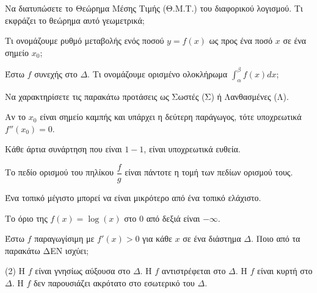 \documentclass[11pt,a4paper]{article}
\newcommand{\kerkissans}[1]{{\fontfamily{maksf}\selectfont \textbf{#1}}}
\renewcommand{\textdexiakeraia}{}
\newcommand\themanum{A}
\newcounter{thema}[section]
\renewcommand{\thethema}{\arabic{thema}}
\newcommand{\Thema}{\refstepcounter{thema}{\textbf{\textcolor{black}{\faPenSquare\ \  \large \kerkissans{\textbf{\thethemaο\hspace{2mm}Διαγώνισμα - Θέμα \themanum}}}}}\hspace{0mm}}{}
\newenvironment{thema}[1]
{\begin{tcolorbox}[title=\Thema\kerkissans{\textbf{\large{  #1}}},breakable,
enhanced standard,titlerule=0pt,toprule=0pt, rightrule=0pt, bottomrule=0pt,
colback=white,left=0mm,top=1mm,bottom=0mm,
boxrule=0pt,
colframe=white,leftrule=0mm,sharp corners,coltitle=black]
\renewcommand{\themanum}{#1}}
{\end{tcolorbox}}
\begin{document}
\begin{thema}{A}
\begin{erwthma}
    \item Να διατυπώσετε το Θεώρημα Μέσης Τιμής (Θ.Μ.Τ.) του διαφορικού λογισμού. Τι εκφράζει το θεώρημα αυτό γεωμετρικά;
    \item Τι ονομάζουμε ρυθμό μεταβολής ενός ποσού $y=f(x)$ ως προς ένα ποσό $x$ σε ένα σημείο $x_0$;
    \item Έστω $f$ συνεχής στο $\Delta$. Τι ονομάζουμε ορισμένο ολοκλήρωμα $\int_\alpha^\beta f(x) dx$;
    \item Να χαρακτηρίσετε τις παρακάτω προτάσεις ως Σωστές (Σ) ή Λανθασμένες (Λ).
    \begin{alist}
        \item Αν το $x_0$ είναι σημείο καμπής και υπάρχει η δεύτερη παράγωγος, τότε υποχρεωτικά $f''(x_0) = 0$.
        \item Kάθε άρτια συνάρτηση που είναι $1-1$, είναι υποχρεωτικά ευθεία.
        \item Το πεδίο ορισμού του πηλίκου $\dfrac{f}{g}$ είναι πάντοτε η τομή των πεδίων ορισμού τους.
        \item Ένα τοπικό μέγιστο μπορεί να είναι μικρότερο από ένα τοπικό ελάχιστο.
        \item Το όριο της $f(x)=\log(x)$ στο 0 από δεξιά είναι $-\infty$.
    \end{alist}
    \item Έστω $f$ παραγωγίσιμη με $f'(x) > 0$ για κάθε $x$ σε ένα διάστημα $\Delta$. Ποιο από τα παρακάτω ΔΕΝ ισχύει;
    \begin{tasks}[label=\let\textdexiakeraia\relax\alph*.](2)
        \task Η $f$ είναι γνησίως αύξουσα στο $\Delta$.
        \task Η $f$ αντιστρέφεται στο $\Delta$.
        \task Η $f$ είναι κυρτή στο $\Delta$.
        \task Η $f$ δεν παρουσιάζει ακρότατο στο εσωτερικό του $\Delta$.
    \end{tasks}
\end{erwthma}
\end{thema}
\vspace{1cm}
\end{document}
